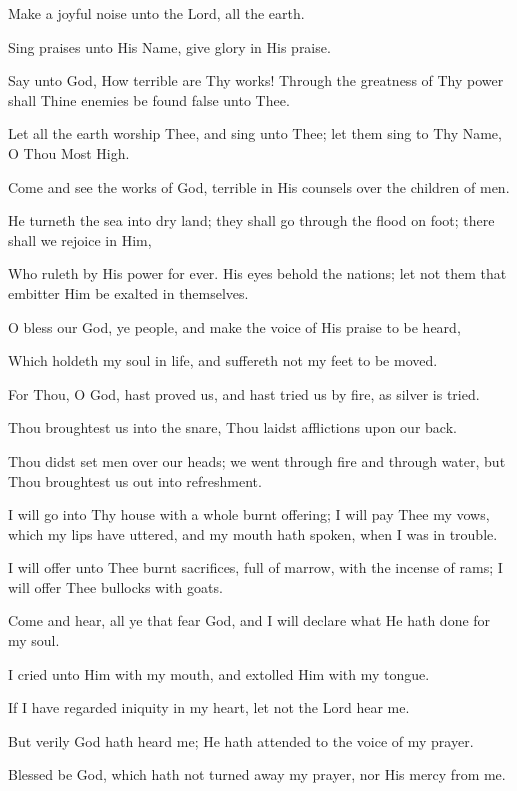 Make a joyful noise unto the Lord, all the earth.

Sing praises unto His Name, give glory in His praise.

Say unto God, How terrible are Thy works! Through the greatness of Thy power shall Thine enemies be found false unto Thee.

Let all the earth worship Thee, and sing unto Thee; let them sing to Thy Name, O Thou Most High.

Come and see the works of God, terrible in His counsels over the children of men.

He turneth the sea into dry land; they shall go through the flood on foot; there shall we rejoice in Him,

Who ruleth by His power for ever. His eyes behold the nations; let not them that embitter Him be exalted in themselves.

O bless our God, ye people, and make the voice of His praise to be heard,

Which holdeth my soul in life, and suffereth not my feet to be moved.

For Thou, O God, hast proved us, and hast tried us by fire, as silver is tried.

Thou broughtest us into the snare, Thou laidst afflictions upon our back.

Thou didst set men over our heads; we went through fire and through water, but Thou broughtest us out into refreshment.

I will go into Thy house with a whole burnt offering; I will pay Thee my vows, which my lips have uttered, and my mouth hath spoken, when I was in trouble.

I will offer unto Thee burnt sacrifices, full of marrow, with the incense of rams; I will offer Thee bullocks with goats.

Come and hear, all ye that fear God, and I will declare what He hath done for my soul.

I cried unto Him with my mouth, and extolled Him with my tongue.

If I have regarded iniquity in my heart, let not the Lord hear me.

But verily God hath heard me; He hath attended to the voice of my prayer.

Blessed be God, which hath not turned away my prayer, nor His mercy from me.
